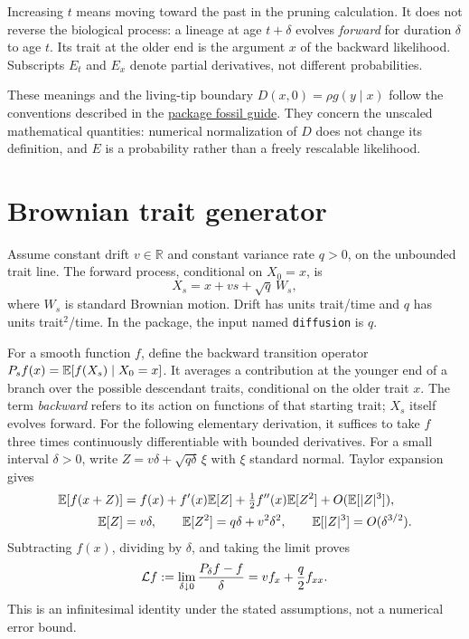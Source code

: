 \documentclass[11pt]{article}
\begin{document}
Increasing $t$ means moving toward the past in the pruning calculation. It does not reverse
the biological process: a lineage at age $t+\delta$ evolves \emph{forward} for duration $\delta$
to age $t$. Its trait at the older end is the argument $x$ of the backward likelihood.
Subscripts $E_t$ and $E_x$ denote partial derivatives, not different probabilities.

These meanings and the living-tip boundary $D(x,0)=\rho g(y\mid x)$ follow the conventions described
in the \href{../../examples/QuaSSE_fossils_fixed_tree.md}{package fossil guide}. They concern the
unscaled mathematical quantities: numerical normalization of $D$ does not change its definition,
and $E$ is a probability rather than a freely rescalable likelihood.

\section{Brownian trait generator}\label{sec:generator}
Assume constant drift $v\in\mathbb{R}$ and constant variance rate $q>0$, on the unbounded trait line.
The forward process, conditional on $X_0=x$, is
\begin{equation}\label{eq:trait-process}
 X_s=x+vs+\sqrt{q}\,W_s,
\end{equation}
where $W_s$ is standard Brownian motion. Drift has units trait/time and $q$ has units
trait$^2$/time. In the package, the input named \texttt{diffusion} is $q$.

For a smooth function $f$, define the backward transition operator
$P_s f(x)=\mathbb{E}[f(X_s)\mid X_0=x]$. It averages a contribution at the younger end of a
branch over the possible descendant traits, conditional on the older trait $x$. The term
\emph{backward} refers to its action on functions of that starting trait; $X_s$ itself evolves
forward. For the following elementary derivation, it suffices to take
$f$ three times continuously differentiable with bounded derivatives. For a small interval
$\delta>0$, write $Z=v\delta+\sqrt{q\delta}\,\xi$ with $\xi$ standard normal. Taylor expansion gives
\begin{align*}
 \mathbb{E}[f(x+Z)]&=f(x)+f'(x)\mathbb{E}[Z]
                   +\tfrac12 f''(x)\mathbb{E}[Z^2]+O(\mathbb{E}[|Z|^3]),\\
 \mathbb{E}[Z]&=v\delta,\qquad
 \mathbb{E}[Z^2]=q\delta+v^2\delta^2,\qquad
 \mathbb{E}[|Z|^3]=O(\delta^{3/2}).
\end{align*}
Subtracting $f(x)$, dividing by $\delta$, and taking the limit proves
\begin{equation}\label{eq:generator}
 \mathcal{L} f:=\lim_{\delta\downarrow0}\frac{P_\delta f-f}{\delta}
       =v f_x+\frac q2 f_{xx}.
\end{equation}
This is an infinitesimal identity under the stated assumptions, not a numerical error bound.
\end{document}
